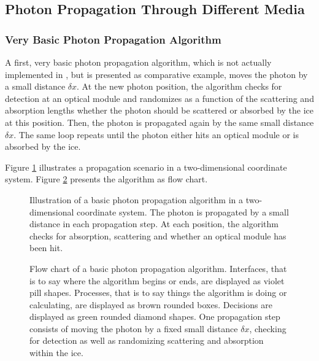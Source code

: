 
\subsection{Photon Propagation Through Different Media}

\subsubsection{Very Basic Photon Propagation Algorithm}

A first, very basic photon propagation algorithm, which is not actually implemented in \clsim, but is presented as comparative example, moves the photon by a small distance $\delta x$. At the new photon position, the algorithm checks for detection at an optical module and randomizes as a function of the scattering and absorption lengths whether the photon should be scattered or absorbed by the ice at this position. Then, the photon is propagated again by the same small distance $\delta x$. The same loop repeats until the photon either hits an optical module or is absorbed by the ice.

Figure \ref{fig:ieph6Bie} illustrates a propagation scenario in a two-dimensional coordinate system. Figure \ref{fig:ohsa0miG} presents the algorithm as flow chart.

\begin{figure}[htb]
  \caption{Illustration of a basic photon propagation algorithm in a two-dimensional coordinate system. The photon is propagated by a small distance in each propagation step. At each position, the algorithm checks for absorption, scattering and whether an optical module has been hit.}
  \label{fig:ieph6Bie}
\end{figure}

\begin{figure}[p]
  \caption{Flow chart of a basic photon propagation algorithm. Interfaces, that is to say where the algorithm begins or ends, are displayed as violet pill shapes. Processes, that is to say things the algorithm is doing or calculating, are displayed as brown rounded boxes. Decisions are displayed as green rounded diamond shapes. One propagation step consists of moving the photon by a fixed small distance $\delta x$, checking for detection as well as randomizing scattering and absorption within the ice.}
  \label{fig:ohsa0miG}
\end{figure}


